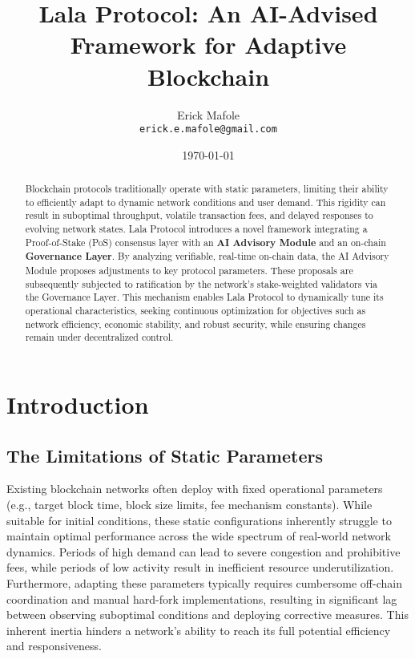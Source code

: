 \documentclass[11pt]{article}
\title{Lala Protocol: An AI-Advised Framework for Adaptive Blockchain}
\author{Erick Mafole\\
\texttt{erick.e.mafole@gmail.com}}
\date{\today}
\begin{document}
\maketitle

\begin{abstract}
Blockchain protocols traditionally operate with static parameters, limiting their ability to efficiently adapt to dynamic network conditions and user demand. This rigidity can result in suboptimal throughput, volatile transaction fees, and delayed responses to evolving network states. Lala Protocol introduces a novel framework integrating a Proof-of-Stake (PoS) consensus layer with an \textbf{AI Advisory Module} and an on-chain \textbf{Governance Layer}. By analyzing verifiable, real-time on-chain data, the AI Advisory Module proposes adjustments to key protocol parameters. These proposals are subsequently subjected to ratification by the network's stake-weighted validators via the Governance Layer. This mechanism enables Lala Protocol to dynamically tune its operational characteristics, seeking continuous optimization for objectives such as network efficiency, economic stability, and robust security, while ensuring changes remain under decentralized control.
\end{abstract}

\section{Introduction}

\subsection{The Limitations of Static Parameters}
Existing blockchain networks often deploy with fixed operational parameters (e.g., target block time, block size limits, fee mechanism constants). While suitable for initial conditions, these static configurations inherently struggle to maintain optimal performance across the wide spectrum of real-world network dynamics. Periods of high demand can lead to severe congestion and prohibitive fees, while periods of low activity result in inefficient resource underutilization. Furthermore, adapting these parameters typically requires cumbersome off-chain coordination and manual hard-fork implementations, resulting in significant lag between observing suboptimal conditions and deploying corrective measures. This inherent inertia hinders a network's ability to reach its full potential efficiency and responsiveness.
\end{document}
